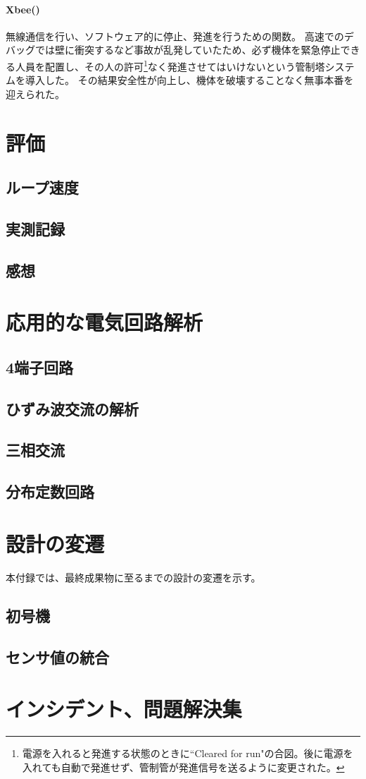 \documentclass{ltjsreport}
\begin{document}
\subsubsection{Xbee()}
無線通信を行い、ソフトウェア的に停止、発進を行うための関数。
高速でのデバッグでは壁に衝突するなど事故が乱発していたため、必ず機体を緊急停止できる人員を配置し、その人の許可\footnote{電源を入れると発進する状態のときに``Cleared for run"の合図。後に電源を入れても自動で発進せず、管制管が発進信号を送るように変更された。}なく発進させてはいけないという管制塔システムを導入した。
その結果安全性が向上し、機体を破壊することなく無事本番を迎えられた。




\chapter{評価}

\section{ループ速度}


\section{実測記録}


\section{感想}




\appendix

\chapter{応用的な電気回路解析}
\section{4端子回路}

\section{ひずみ波交流の解析}

\section{三相交流}

\section{分布定数回路}


\chapter{設計の変遷}
本付録では、最終成果物に至るまでの設計の変遷を示す。
\section{初号機}


\section{センサ値の統合}



\chapter{インシデント、問題解決集}
\end{document}
